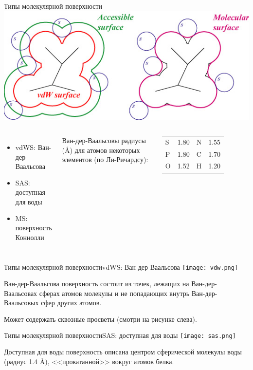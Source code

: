 \documentclass{beamer}
\begin{document}
    \begin{frame}{Типы молекулярной поверхности}
        \includegraphics[width=\linewidth]{types.jpg}
        \begin{columns}[t]
            \begin{itemize}
            \item vdWS: Ван-дер-Ваальсова
            \item SAS: доступная для воды
            \item MS: поверхность Коннолли
            \end{itemize}
            \column{5cm}
            Ван-дер-Ваальсовы радиусы (\AA) для атомов
            некоторых элементов (по Ли-Ричардсу):

            \begin{tabular}{ l l | l l }
                S & 1.80 & N & 1.55 \\
                P & 1.80 & C & 1.70 \\
                O & 1.52 & H & 1.20 \\
            \end{tabular}
        \end{columns}
    \end{frame}

    \begin{frame}{Типы молекулярной поверхности}{vdWS: Ван-дер-Ваальсова}
        \texttt{[image: vdw.png]}

        Ван-дер-Ваальсова поверхность состоит из точек,
        лежащих на Ван-дер-Ваальсовах сферах атомов молекулы и
        не попадающих внутрь Ван-дер-Ваальсовых сфер других атомов.

        Может содержать сквозные просветы (смотри на рисунке слева).
    \end{frame}

    \begin{frame}{Типы молекулярной поверхности}{SAS: доступная для воды}
        \texttt{[image: sas.png]}

        Доступная для воды поверхность описана центром
        сферической молекулы воды (радиус 1.4 \AA),
        <<прокатанной>> вокруг атомов белка.


    \end{frame}
\end{document}
